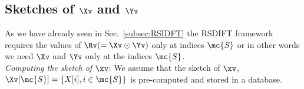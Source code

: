 \begin{enumerate}
\subsection{Sketches of $\Xv$ and $\Yv$} 
\label{subsec:skteches}		 
 As we have already seen in Sec.~\ref{subsec:RSIDFT} the RSDIFT framework requires the values of $\Rv(=\Xv\odot \Yv)$ only at indices $\mc{S}$ or in other words we need $\Xv$ and $\Yv$ only at the indices $\mc{S}$. \\
% 

\textit{Computing the sketch of $\xv$}: We assume that the sketch of $\xv$, $ \Xv[\mc{S}]= \{X[i],i\in \mc{S}\}$ is pre-computed and stored in a database.  \\


\end{enumerate}
